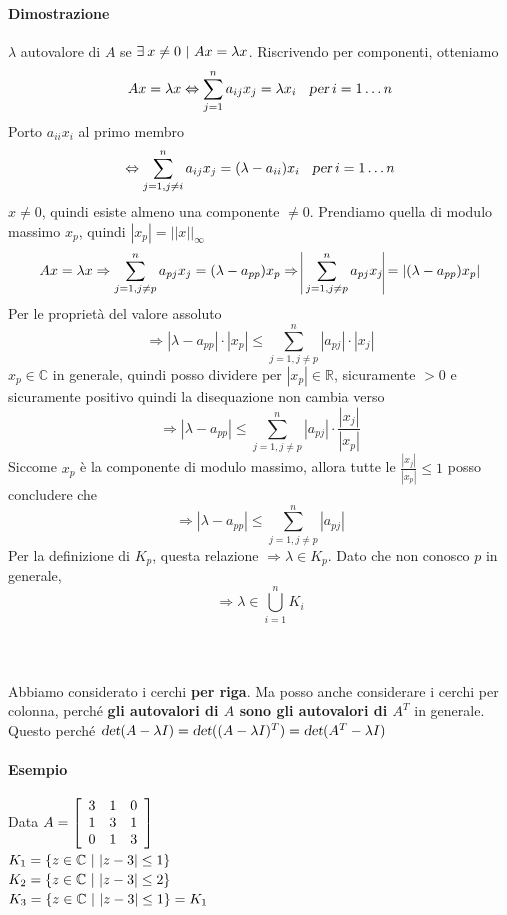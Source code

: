 \documentclass[10pt]{book}
\begin{document}
\paragraph{Dimostrazione} $\lambda$ autovalore di $A$ se $\exists\:x \neq 0 \:\:\vline\:\: Ax = \lambda x$. Riscrivendo per componenti, otteniamo
$$Ax = \lambda x \Leftrightarrow \sum_{j = 1}^n a_{ij}x_j = \lambda x_i\:\:\:\:\textsl{per}\:i = 1\ldots n$$
Porto $a_{ii}x_i$ al primo membro
$$\Leftrightarrow  \sum_{j = 1, j \neq i}^n a_{ij}x_j = (\lambda - a_{ii})x_i\:\:\:\:\textsl{per}\:i = 1\ldots n$$
$x \neq 0$, quindi esiste almeno una componente $\neq 0$. Prendiamo quella di modulo massimo $x_p$, quindi $|x_p| = ||x||_\infty$
$$Ax = \lambda x \Rightarrow \sum_{j = 1, j \neq p}^n a_{pj}x_j = (\lambda - a_{pp})x_p \Rightarrow\:\vline\sum_{j = 1, j \neq p}^n a_{pj}x_j\vline = |(\lambda - a_{pp})x_p|$$
Per le proprietà del valore assoluto
$$\Rightarrow |\lambda - a_{pp}|\cdot|x_p| \leq \sum_{j = 1, j \neq p}^n |a_{pj}|\cdot |x_j| $$
$x_p \in \mathbb{C}$ in generale, quindi posso dividere per $|x_p| \in \mathbb{R}$, sicuramente $> 0$ e sicuramente positivo quindi la disequazione non cambia verso
$$\Rightarrow |\lambda - a_{pp}| \leq \sum_{j = 1, j \neq p}^n |a_{pj}|\cdot \frac{|x_j|}{|x_p|} $$
Siccome $x_p$ è la componente di modulo massimo, allora tutte le $\frac{|x_j|}{|x_p|} \leq 1$ posso concludere che
$$\Rightarrow |\lambda - a_{pp}| \leq \sum_{j = 1, j \neq p}^n |a_{pj}|$$
Per la definizione di $K_p$, questa relazione $\Rightarrow \lambda \in K_p$. Dato che non conosco $p$ in generale, $$\Rightarrow \lambda \in \bigcup_{i = 1}^n K_i$$\\\\\\
Abbiamo considerato i cerchi \textbf{per riga}. Ma posso anche considerare i cerchi per colonna, perché \textbf{gli autovalori di $A$ sono gli autovalori di $A^T$} in generale.\\
Questo perché $\textsl{det}(A - \lambda I) = \textsl{det}((A - \lambda I)^T) = \textsl{det}(A^T - \lambda I)$
\paragraph{Esempio} Data \begin{math}
A = \left[ 
	\begin{array}{c c c}
		3 & 1 & 0\\
		1 & 3 & 1\\
		0 & 1 & 3
	\end{array}
	\right]
\end{math}\\
$K_1 = \left\{ z \in \mathbb{C} \:\:\vline\:\: |z - 3| \leq 1\right\}$\\
$K_2 = \left\{ z \in \mathbb{C} \:\:\vline\:\: |z - 3| \leq 2\right\}$\\
$K_3 = \left\{ z \in \mathbb{C} \:\:\vline\:\: |z - 3| \leq 1\right\} = K_1$
\end{document}
